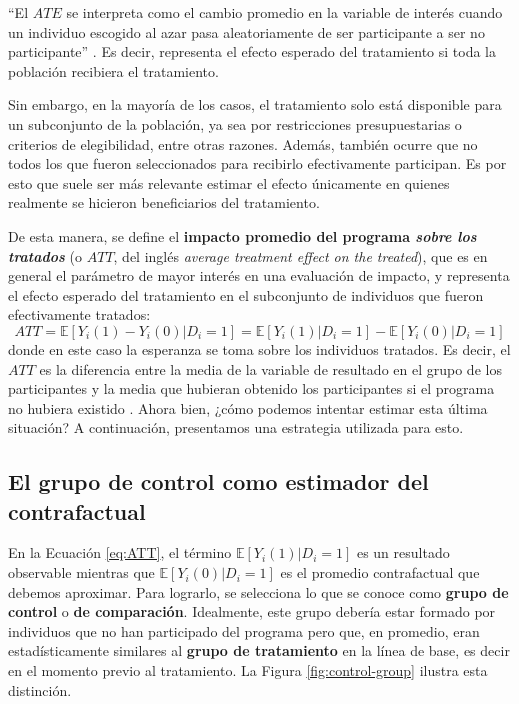 \documentclass[../../main.tex]{subfiles}
\begin{document}
``El \(ATE\) se interpreta como el cambio promedio en la variable de interés cuando un
individuo escogido al azar pasa aleatoriamente de ser participante a ser no participante''
\cite{bernal}. Es decir, representa el efecto esperado del tratamiento si toda la
población recibiera el tratamiento.

Sin embargo, en la mayoría de los casos, el tratamiento solo está disponible para un
subconjunto de la población, ya sea por restricciones presupuestarias o criterios de
elegibilidad, entre otras razones. Además, también ocurre que no todos los que fueron
seleccionados para recibirlo efectivamente participan. Es por esto que suele ser más
relevante estimar el efecto únicamente en quienes realmente se hicieron beneficiarios del
tratamiento.

De esta manera, se define el \textbf{impacto promedio del programa \textit{sobre los
tratados}} (o \(ATT\), del inglés \textit{average treatment effect on the treated}), que
es en general el parámetro de mayor interés en una evaluación de impacto, y representa el
efecto esperado del tratamiento en el subconjunto de individuos que fueron efectivamente
tratados:
\begin{equation}
    ATT = \mathbb{E} \left[Y_i(1)-Y_i(0)|D_i=1\right] = \mathbb{E} \left[Y_i(1)|D_i=1\right] -
    \mathbb{E} \left[Y_i(0)|D_i=1\right]
    \label{eq:ATT}
\end{equation}
donde en este caso la esperanza se toma sobre los individuos tratados. Es decir, el
\(ATT\) es la diferencia entre la media de la variable de resultado en el grupo de los
participantes y la media que hubieran obtenido los participantes si el programa no hubiera
existido \cite{bernal}. Ahora bien, ¿cómo podemos intentar estimar esta última situación?
A continuación, presentamos una estrategia utilizada para esto.

\subsection{El grupo de control como estimador del contrafactual}
En la Ecuación \ref{eq:ATT}, el término \(\mathbb{E} \left[Y_i(1)|D_i=1\right]\) es un
resultado observable mientras que \(\mathbb{E} \left[Y_i(0)|D_i=1\right]\) es el promedio
contrafactual que debemos aproximar. Para lograrlo, se selecciona lo que se conoce como
\textbf{grupo de control} o \textbf{de comparación}. Idealmente, este grupo debería estar
formado por individuos que no han participado del programa pero que, en promedio, eran
estadísticamente similares \cite{gertler-2016} al \textbf{grupo de tratamiento} en la
línea de base, es decir en el momento previo al tratamiento. La Figura
\ref{fig:control-group} ilustra esta distinción.
\end{document}
